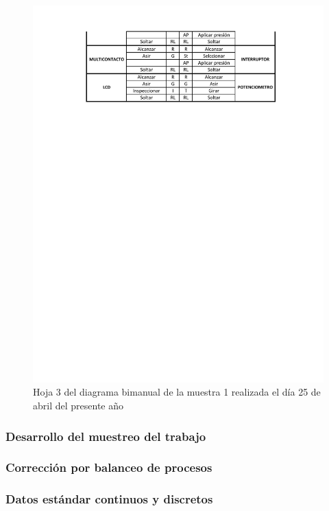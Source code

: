     \begin{figure}[H]
        \centering
        \includegraphics[trim = {1mm 180mm 1mm 1mm},clip,scale=0.45]{34/img/diagramaBimanual3.pdf}
        \caption{Hoja 3 del diagrama bimanual de la muestra 1 realizada el día 25 de abril del presente año}
        \label{fig:diagramaBimanual3}
    \end{figure}
    \subsubsection{Desarrollo del muestreo del trabajo}
    \subsubsection{Corrección por balanceo de procesos}
    \subsubsection{Datos estándar continuos y discretos}
